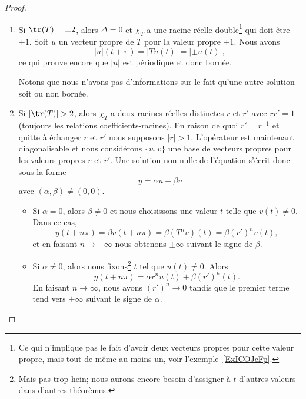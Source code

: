 \begin{proof}
\begin{enumerate}
        \item

            Si \( \tr(T)=\pm 2\), alors \( \Delta=0\) et \( \chi_T\) a une racine réelle double\footnote{Ce qui n'implique pas le fait d'avoir deux vecteurs propres pour cette valeur propre, mais tout de même au moins un, voir l'exemple~\ref{ExICOJcFp}.} qui doit être \( \pm 1\). Soit \( u\) un vecteur propre de \( T\) pour la valeur propre \( \pm 1\). Nous avons
            \begin{equation}
                | u |(t+\pi)=| Tu(t) |=| \pm u(t) |,
            \end{equation}
            ce qui prouve encore que \( | u |\) est périodique et donc bornée.

            Notons que nous n'avons pas d'informations sur le fait qu'une autre solution soit ou non bornée.

        \item

            Si \( | \tr(T) |>2\), alors \( \chi_T\) a deux racines réelles distinctes \( r\) et \( r'\) avec \( rr'=1\) (toujours les relations coefficients-racines). En raison de quoi \( r'=r^{-1}\) et quitte à échanger \( r\) et \( r'\) nous supposons \( | r |>1\). L'opérateur est maintenant diagonalisable et nous considérons \( \{ u,v \}\) une base de vecteurs propres pour les valeurs propres \( r\) et \( r'\). Une solution non nulle de l'équation s'écrit donc sous la forme
            \begin{equation}
                y=\alpha u+\beta v
            \end{equation}
            avec \( (\alpha,\beta)\neq (0,0)\).

            \begin{itemize}
                \item Si \( \alpha=0\), alors \( \beta\neq 0\) et nous choisissons une valeur \( t\) telle que \( v(t)\neq 0\). Dans ce cas,
                    \begin{equation}
                        y(t+n\pi)=\beta v(t+n\pi)=\beta(T^nv)(t)=\beta (r')^n v(t),
                    \end{equation}
                    et en faisant \( n\to -\infty\) nous obtenons \( \pm \infty\) suivant le signe de \( \beta\).

                \item Si \( \alpha\neq 0\), alors nous fixons\footnote{Mais pas trop hein; nous aurons encore besoin d'assigner à \( t\) d'autres valeurs dans d'autres théorèmes.} \( t\) tel que \( u(t)\neq 0\). Alors
                    \begin{equation}
                        y(t+n\pi)=\alpha r^nu(t)+\beta (r')^n(t).
                    \end{equation}
                    En faisant \( n\to \infty\), nous avons \( (r')^n\to 0\) tandis que le premier terme tend vers \( \pm\infty\) suivant le signe de \( \alpha\).
            \end{itemize}


\end{enumerate}
\end{proof}
